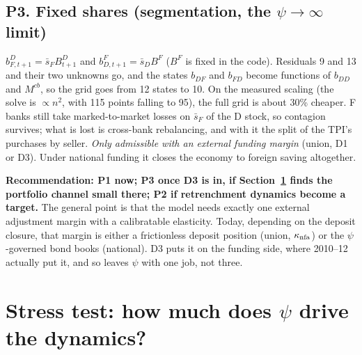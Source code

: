 \documentclass[11pt]{article}
\begin{document}
\subsection*{P3. Fixed shares (segmentation, the $\psi\to\infty$ limit)}

$b^D_{F,t+1}=\bar s_FB^D_{t+1}$ and $b^F_{D,t+1}=\bar s_DB^F$ ($B^F$ is fixed in the code).
Residuals 9 and 13 and their two unknowns go, and the states $b_{DF}$ and $b_{FD}$ become
functions of $b_{DD}$ and $M^{cb}$, so the grid goes from 12 states to 10. On the measured
scaling (the solve is $\propto n^2$, with 115 points falling to 95), the full grid is about 30\%
cheaper. F banks still take marked-to-market losses on $\bar s_F$ of the D stock, so contagion
survives; what is lost is cross-bank rebalancing, and with it the split of the TPI's purchases
by seller. \emph{Only admissible with an external funding margin} (union, D1 or D3). Under
national funding it closes the economy to foreign saving altogether.

\textbf{Recommendation: P1 now; P3 once D3 is in, if Section~\ref{sec:stress} finds the
portfolio channel small there; P2 if retrenchment dynamics become a target.} The general point
is that the model needs exactly one external adjustment margin with a calibratable elasticity.
Today, depending on the deposit closure, that margin is either a frictionless deposit position
(union, $\kappa_{\rm nfa}$) or the $\psi$-governed bond books (national). D3 puts it on the
funding side, where 2010--12 actually put it, and so leaves $\psi$ with one job, not three.

\section{Stress test: how much does $\psi$ drive the dynamics?}
\label{sec:stress}
\end{document}
